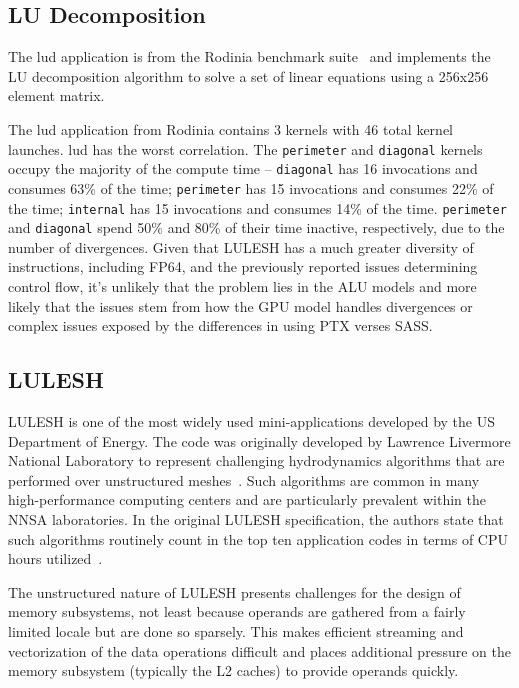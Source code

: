 \subsection{LU Decomposition}
\label{sec:lud}
The lud application is from the Rodinia benchmark
suite~\cite{rodinia_5306797}\cite{rodinia_5650274} and implements the LU
decomposition algorithm to solve a set of linear equations using a 256x256
element matrix.

The lud application from Rodinia contains 3 kernels with 46 total kernel
launches. lud has the worst correlation. The \texttt{perimeter} and
\texttt{diagonal} kernels occupy the majority of the compute time --
\texttt{diagonal} has 16 invocations and consumes 63\% of the time;
\texttt{perimeter} has 15 invocations and consumes 22\% of the time;
\texttt{internal} has 15 invocations and consumes 14\% of the time.
\texttt{perimeter} and \texttt{diagonal} spend 50\% and 80\% of their time
inactive, respectively, due to the number of divergences. Given that LULESH has
a much greater diversity of instructions, including FP64, and the previously
reported issues determining control flow, it's unlikely that the problem lies in
the ALU models and more likely that the issues stem from how the GPU model
handles divergences or complex issues exposed by the differences in using PTX
verses SASS.


\subsection{LULESH}
\label{sec:lulesh}
LULESH is one of the most widely used mini-applications developed by the US
Department of Energy. The code was originally developed by Lawrence Livermore
National Laboratory to represent challenging hydrodynamics algorithms that are
performed over unstructured meshes~\cite{lulesh:spec}\cite{lulesh:changes}.
Such algorithms are common in many high-performance computing centers and are
particularly prevalent within the NNSA laboratories. In the original LULESH
specification, the authors state that such algorithms routinely count in the top
ten application codes in terms of CPU hours utilized~\cite{lulesh:spec}.

The unstructured nature of LULESH presents challenges for the design of memory
subsystems, not least because operands are gathered from a fairly limited locale
but are done so sparsely. This makes efficient streaming and vectorization of
the data operations difficult and places additional pressure on the memory
subsystem (typically the L2 caches) to provide operands quickly.

